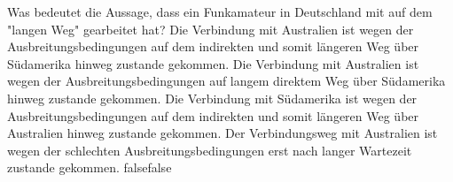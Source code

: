    {Was bedeutet die Aussage, dass ein Funkamateur in Deutschland mit  auf dem "langen Weg" gearbeitet hat?}
    {Die Verbindung mit Australien ist wegen der Ausbreitungsbedingungen auf dem indirekten und somit längeren Weg über Südamerika hinweg zustande gekommen.}
    {Die Verbindung mit Australien ist wegen der Ausbreitungsbedingungen auf langem direktem Weg über Südamerika hinweg zustande gekommen.}
    {Die Verbindung mit Südamerika ist wegen der Ausbreitungsbedingungen auf dem indirekten und somit längeren Weg über Australien hinweg zustande gekommen.}
    {Der Verbindungsweg mit Australien ist wegen der schlechten Ausbreitungsbedingungen erst nach langer Wartezeit zustande gekommen.}
    {false}{false}
